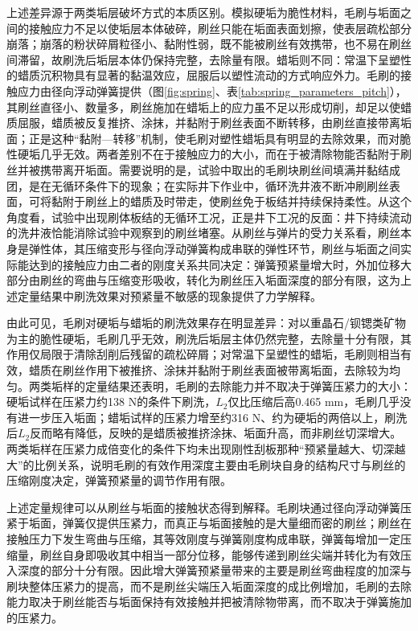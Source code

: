 上述差异源于两类垢层破坏方式的本质区别。模拟硬垢为脆性材料，毛刷与垢面之间的接触应力不足以使垢层本体破碎，刷丝只能在垢面表面划擦，使表层疏松部分崩落；崩落的粉状碎屑粒径小、黏附性弱，既不能被刷丝有效携带，也不易在刷丝间滞留，故刷洗后垢层本体仍保持完整，去除量有限。蜡垢则不同：常温下呈塑性的蜡质沉积物具有显著的黏温效应，屈服后以塑性流动的方式响应外力。毛刷的接触应力由径向浮动弹簧提供（图\ref{fig:spring}、表\ref{tab:spring_parameters_pitch}），其刷丝直径小、数量多，刷丝施加在蜡垢上的应力虽不足以形成切削，却足以使蜡质屈服，蜡质被反复推挤、涂抹，并黏附于刷丝表面不断转移，由刷丝直接带离垢面；正是这种“黏附—转移”机制，使毛刷对塑性蜡垢具有明显的去除效果，而对脆性硬垢几乎无效。两者差别不在于接触应力的大小，而在于被清除物能否黏附于刷丝并被携带离开垢面。需要说明的是，试验中取出的毛刷块刷丝间填满并黏结成团，是在无循环条件下的现象；在实际井下作业中，循环洗井液不断冲刷刷丝表面，可将黏附于刷丝上的蜡质及时带走，使刷丝免于板结并持续保持柔性。从这个角度看，试验中出现刷体板结的无循环工况，正是井下工况的反面：井下持续流动的洗井液恰能消除试验中观察到的刷丝堵塞。从刷丝与弹片的受力关系看，刷丝本身是弹性体，其压缩变形与径向浮动弹簧构成串联的弹性环节，刷丝与垢面之间实际能达到的接触应力由二者的刚度关系共同决定：弹簧预紧量增大时，外加位移大部分由刷丝的弯曲与压缩变形吸收，转化为刷丝压入垢面深度的部分有限，这为上述定量结果中刷洗效果对预紧量不敏感的现象提供了力学解释。

由此可见，毛刷对硬垢与蜡垢的刷洗效果存在明显差异：对以重晶石/钡锶类矿物为主的脆性硬垢，毛刷几乎无效，刷洗后垢层主体仍然完整，去除量十分有限，其作用仅局限于清除刮削后残留的疏松碎屑；对常温下呈塑性的蜡垢，毛刷则相当有效，蜡质在刷丝作用下被推挤、涂抹并黏附于刷丝表面被带离垢面，去除较为均匀。两类垢样的定量结果还表明，毛刷的去除能力并不取决于弹簧压紧力的大小：硬垢试样在压紧力约138 N的条件下刷洗，$L_2$仅比压缩后高0.465 mm，毛刷几乎没有进一步压入垢面；蜡垢试样的压紧力增至约316 N、约为硬垢的两倍以上，刷洗后$L_2$反而略有降低，反映的是蜡质被推挤涂抹、垢面升高，而非刷丝切深增大。两类垢样在压紧力成倍变化的条件下均未出现刚性刮板那种“预紧量越大、切深越大”的比例关系，说明毛刷的有效作用深度主要由毛刷块自身的结构尺寸与刷丝的压缩刚度决定，弹簧预紧量的调节作用有限。

上述定量规律可以从刷丝与垢面的接触状态得到解释。毛刷块通过径向浮动弹簧压紧于垢面，弹簧仅提供压紧力，而真正与垢面接触的是大量细而密的刷丝；刷丝在接触压力下发生弯曲与压缩，其等效刚度与弹簧刚度构成串联，弹簧每增加一定压缩量，刷丝自身即吸收其中相当一部分位移，能够传递到刷丝尖端并转化为有效压入深度的部分十分有限。因此增大弹簧预紧量带来的主要是刷丝弯曲程度的加深与刷块整体压紧力的提高，而不是刷丝尖端压入垢面深度的成比例增加，毛刷的去除能力取决于刷丝能否与垢面保持有效接触并把被清除物带离，而不取决于弹簧施加的压紧力。

